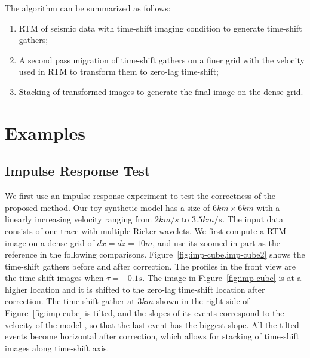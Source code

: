 The algorithm can be summarized as follows:
\begin{enumerate}
\item RTM of seismic data with time-shift imaging condition to generate time-shift gathers;
\item A second pass migration of time-shift gathers on a finer grid with the velocity used in RTM to transform them to zero-lag time-shift; 
\item Stacking of transformed images to generate the final image on the dense grid.
\end{enumerate}

\section{Examples}
\subsection{Impulse Response Test}

We first use an impulse response experiment to test the correctness of the proposed method.
Our toy synthetic model has a size of $6km\times6km$ with a linearly increasing velocity ranging from $2km/s$ to $3.5km/s$.
The input data consists of one trace with multiple Ricker wavelets.
We first compute a RTM image on a dense grid of $dx=dz=10m$,
and use its zoomed-in part as the reference in the following comparisons.
Figure~\ref{fig:imp-cube,imp-cube2} shows the time-shift gathers before and after correction.
The profiles in the front view are the time-shift images when $\tau=-0.1s$.
The image in Figure~\ref{fig:imp-cube} is at a higher location 
and it is shifted to the zero-lag time-shift location after correction.
The time-shift gather at $3km$ shown in the right side of Figure~\ref{fig:imp-cube} is tilted, and the slopes of
its events correspond to the velocity of the model \cite[]{sava06,xu14}, so that the last event has the biggest slope.
All the tilted events become horizontal after correction, which allows for stacking of time-shift images along time-shift axis.



